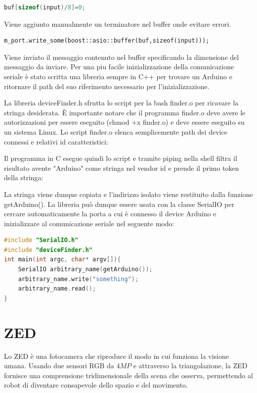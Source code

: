 \documentclass[a4paper]{article}
\begin{document}
\begin{lstlisting}[language=C++,firstnumber=27]
buf[sizeof(input)/8]=0;
\end{lstlisting}
Viene aggiunto manualmente un terminatore nel buffer onde evitare errori.

\begin{lstlisting}
m_port.write_some(boost::asio::buffer(buf,sizeof(input)));
\end{lstlisting}
Viene inviato il messaggio contenuto nel buffer specificando la dimensione del messaggio da inviare.
\newpage
Per una piu facile inizializzazione della comunicazione seriale è stato scritta una libreria sempre in C++ per trovare un Arduino e ritornare il path del suo riferimento necessario per l'inizializzazione.




La libreria deviceFinder.h sfrutta lo script per la bash finder.o per ricavare la stringa desiderata.
È importante notare che il programma finder.o deve avere le autorizzazioni per essere eseguito (chmod +x finder.o) e deve essere eseguito su un sistema Linux.
Lo script finder.o elenca semplicemente path dei device connessi e relativi id caratteristici:

Il programma in C esegue quindi lo script e tramite piping nella shell filtra il risultato avente "Arduino" come stringa nel vendor id e prende il primo token della stringa:

La stringa viene dunque copiata e l'indirizzo isolato viene restituito dalla funzione getArduino().
La libreria può dunque essere usata con la classe SerialIO per cercare automaticamente la porta a cui è connesso il device Arduino e inizializzare al comunicazione seriale nel seguente modo:
\begin{lstlisting}[language=C++]
#include "SerialIO.h"
#include "deviceFinder.h"
int main(int argc, char* argv[]){
    SerialIO arbitrary_name(getArduino());
    arbitrary_name.write("something");
    arbitrary_name.read();
}
\end{lstlisting}

\newpage




\section{ZED}
Lo ZED è una fotocamera che riproduce il modo in cui funziona la visione umana. Usando due sensori RGB da $4MP$ e attraverso la triangolazione, la ZED fornisce una comprensione tridimensionale della scena che osserva, permettendo al robot di diventare consapevole dello spazio e del movimento.
\end{document}
